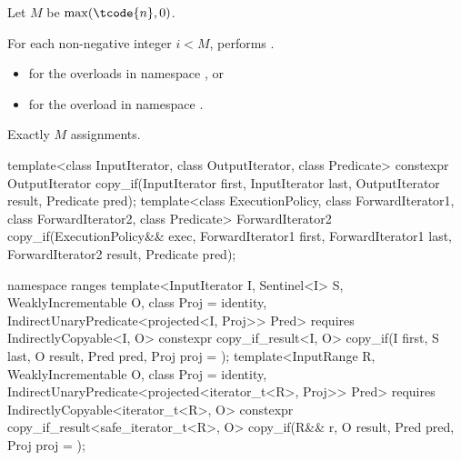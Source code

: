 \begin{itemdescr}
\pnum
Let $M$ be $\max(\tcode{n}, 0)$.

\pnum
\effects
For each non-negative integer $i < M$,
performs .

\pnum
\returns
\begin{itemize}
\item
  for the overloads in namespace , or
\item
  for the overload in namespace .
\end{itemize}

\pnum
\complexity
Exactly $M$ assignments.
\end{itemdescr}

%
\begin{itemdecl}
template<class InputIterator, class OutputIterator, class Predicate>
  constexpr OutputIterator copy_if(InputIterator first, InputIterator last,
                                   OutputIterator result, Predicate pred);
template<class ExecutionPolicy, class ForwardIterator1, class ForwardIterator2,
         class Predicate>
  ForwardIterator2 copy_if(ExecutionPolicy&& exec,
                           ForwardIterator1 first, ForwardIterator1 last,
                           ForwardIterator2 result, Predicate pred);

namespace ranges {
  template<InputIterator I, Sentinel<I> S, WeaklyIncrementable O, class Proj = identity,
           IndirectUnaryPredicate<projected<I, Proj>> Pred>
    requires IndirectlyCopyable<I, O>
    constexpr copy_if_result<I, O>
      copy_if(I first, S last, O result, Pred pred, Proj proj = {});
  template<InputRange R, WeaklyIncrementable O, class Proj = identity,
           IndirectUnaryPredicate<projected<iterator_t<R>, Proj>> Pred>
    requires IndirectlyCopyable<iterator_t<R>, O>
    constexpr copy_if_result<safe_iterator_t<R>, O>
      copy_if(R&& r, O result, Pred pred, Proj proj = {});
}
\end{itemdecl}

